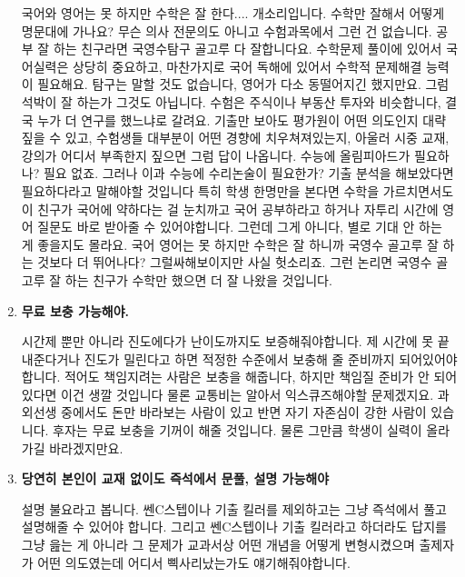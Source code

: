 \begin{enumerate}
    국어와 영어는 못 하지만 수학은 잘 한다.... 개소리입니다. 수학만 잘해서 어떻게 명문대에 가나요?
    무슨 의사 전문의도 아니고 수험과목에서 그런 건 없습니다. 공부 잘 하는 친구라면 국영수탐구 골고루 다 잘합니다요.
    수학문제 풀이에 있어서 국어실력은 상당히 중요하고, 마찬가지로 국어 독해에 있어서 수학적 문제해결 능력이 필요해요.
    탐구는 말할 것도 없습니다, 영어가 다소 동떨어지긴 했지만요.
    그럼 석박이 잘 하는가 그것도 아닙니다. 수험은 주식이나 부동산 투자와 비슷합니다, 결국 누가 더 연구를 했느냐로 갈려요.
    기출만 보아도 평가원이 어떤 의도인지 대략 짚을 수 있고, 수험생들 대부분이 어떤 경향에 치우쳐져있는지,
    아울러 시중 교재, 강의가 어디서 부족한지 짚으면 그럼 답이 나옵니다.
    수능에 올림피아드가 필요하나? 필요 없죠. 그러나 이과 수능에 수리논술이 필요한가?
    기출 분석을 해보았다면 필요하다라고 말해야할 것입니다
    특히 학생 한명만을 본다면 수학을 가르치면서도 이 친구가 국어에 약하다는 걸 눈치까고 국어 공부하라고 하거나
    자투리 시간에 영어 질문도 바로 받아줄 수 있어야합니다.  그런데 그게 아니다, 별로 기대 안 하는 게 좋을지도 몰라요.
    국어 영어는 못 하지만 수학은 잘 하니까 국영수 골고루 잘 하는 것보다 더 뛰어나다?
    그럴싸해보이지만 사실 헛소리죠.  그런 논리면 국영수 골고루 잘 하는 친구가 수학만 했으면 더 잘 나왔을 것입니다.
    \vspace{5mm}

    \item \textbf{무료 보충 가능해야.}
    \vspace{5mm}

    시간제 뿐만 아니라 진도에다가 난이도까지도 보증해줘야합니다.
    제 시간에 못 끝내준다거나 진도가 밀린다고 하면 적정한 수준에서 보충해 줄 준비까지 되어있어야합니다.
    적어도 책임지려는 사람은 보충을 해줍니다, 하지만 책임질 준비가 안 되어있다면 이건 생깔 것입니다
    물론 교통비는 알아서 익스큐즈해야할 문제겠지요.
    과외선생 중에서도 돈만 바라보는 사람이 있고 반면 자기 자존심이 강한 사람이 있습니다.
    후자는 무료 보충을 기꺼이 해줄 것입니다. 물론 그만큼 학생이 실력이 올라가길 바라겠지만요.
    \vspace{5mm}

    \item \textbf{당연히 본인이 교재 없이도 즉석에서 문풀, 설명 가능해야}
    \vspace{5mm}

    설명 불요라고 봅니다. 쎈C스텝이나 기출 킬러를 제외하고는 그냥 즉석에서 풀고 설명해줄 수 있어야 합니다.
    그리고 쎈C스텝이나 기출 킬러라고 하더라도 답지를 그냥 읊는 게 아니라
    그 문제가 교과서상 어떤 개념을 어떻게 변형시켰으며 출제자가 어떤 의도였는데 어디서 삑사리났는가도 얘기해줘야합니다.
    \vspace{5mm}


\end{enumerate}
